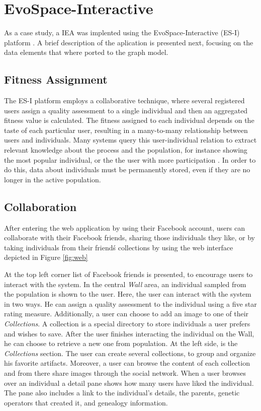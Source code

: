 \documentclass[conference]{IEEEtran}
\begin{document}
\section{EvoSpace-Interactive}
\label{sec:evospace-i} 
As a case study, a IEA was implented using the 
EvoSpace-Interactive (ES-I) platform \cite{garcia2013evospace}. %
A brief description of the aplication is presented next, focusing
on the data elements that where ported to the graph model.

\subsection{Fitness Assignment}
\label{sec:col}
The ES-I platform employs a collaborative technique,
where several registered users assign a quality assessment to a single
individual and then an aggregated fitness value is calculated. The fitness
assigned to each individual depends on the taste of each particular user, 
resulting in a many-to-many relationship between users and individuals. 
Many systems query this user-individual relation to extract relevant
knowledge about the process and the population, for instance showing the
most popular individual, or the the user with more participation \cite{picbreeder}.
In order to do this, data about individuals %
must be permanently stored, even
if they are no longer in the active population. 

\subsection{Collaboration}
\label{sec:col}
After entering the web application by using their Facebook account,
users can collaborate with their Facebook friends, 
sharing those individuals they like, or by taking individuals
from their friend\'s collections by using the web interface depicted 
in Figure \ref{fig:web}


At the top left corner list of Facebook friends is presented, 
to encourage users to interact with the system. In the central 
\emph{ Wall } area, an individual sampled from the population 
is shown to the user.
Here, the user can interact with the system in two ways.
He can assign a quality assessment to the individual using
a five star rating measure.
Additionally, a user can choose to add an image to one of their \emph{Collections}.
A collection is a special directory to store individuals a user prefers and wishes
to save. After the user finishes interacting the individual
on the Wall, he can choose to retrieve a new one from population.
At the left side, is the \emph{Collections} section.
The user can create several collections, to group and organize his favorite 
artifacts. Moreover, a user can browse the content of each collection and from
there share images through the social network.
When a user browses over an individual a detail pane shows how many users have
liked the individual. The pane also includes a link to the individual's 
details, the parents, genetic operators that created it, and genealogy information.
 
\end{document}
